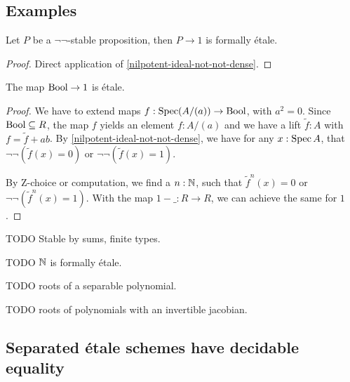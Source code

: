 \subsection{Examples}

\begin{proposition}%
  Let $P$ be a $\neg\neg$-stable proposition,
  then $P\to 1$ is formally étale.
\end{proposition}

\begin{proof}
  Direct application of \cref{nilpotent-ideal-not-not-dense}.
\end{proof}

\begin{proposition}%
  The map $\mathrm{Bool}\to 1$ is étale.
\end{proposition}

\begin{proof}
  We have to extend maps $f:\operatorname{Spec} (A/(a))\to \mathrm{Bool}$, with $a^2=0$.
  Since $\mathrm{Bool}\subseteq R$, the map $f$ yields an element $f:A/(a)$
  and we have a lift $\tilde{f}:A$ with $f=\tilde{f}+ab$.
  By \cref{nilpotent-ideal-not-not-dense},
  we have for any $x:\operatorname{Spec} A$, that $\neg\neg(\tilde{f}(x)=0)$ or $\neg\neg(\tilde{f}(x)=1)$.

  By Z-choice or computation, we find a $n:\mathbb{N}$,
  such that $\tilde{f}^n(x)=0$ or $\neg\neg(\tilde{f}^n(x)=1)$.
  With the map $1-\_:R\to R$, we can achieve the same for $1$.
\end{proof}

\begin{proposition}
TODO Stable by sums, finite types.
\end{proposition}

\begin{proposition}
TODO $\mathbb{N}$ is formally étale.
\end{proposition}

\begin{proposition}
TODO roots of a separable polynomial.
\end{proposition}

\begin{proposition}
TODO roots of polynomials with an invertible jacobian.
\end{proposition}

\subsection{Separated étale schemes have decidable equality}

